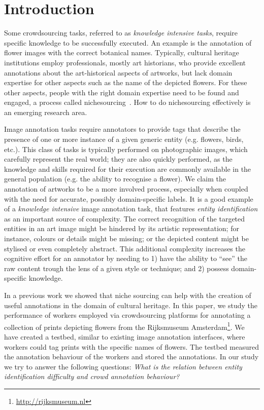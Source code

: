 \documentclass{sig-alternate-2013}
\begin{document}

\section{Introduction}
Some crowdsourcing tasks, referred to as \emph{knowledge intensive tasks}\cite{Oosterman:2014}, require specific knowledge to be successfully executed. An example is the annotation of flower images with the correct botanical names. Typically, cultural heritage institutions employ professionals, mostly art historians, who provide excellent annotations about the art-historical aspects of artworks, but lack domain expertise for other aspects such as the name of the depicted flowers. For these other aspects, people with the right domain expertise need to be found and engaged, a process called nichesourcing~\cite{Boer2012}. How to do nichesourcing effectively is an emerging research area. 

Image annotation tasks require annotators to provide tags that describe the presence of one or more instance of a given generic entity (e.g. flowers, birds, etc.). This class of tasks is typically performed on photographic images, which carefully represent the real world; they are also quickly performed, as the knowledge and skills required for their execution are commonly available in the general population (e.g. the ability to recognise a flower). We claim the annotation of artworks to be a more involved process, especially when coupled with the need for accurate, possibly domain-specific labels. It is a good example of  a \textit{knowledge intensive} image annotation task, that features \textit{entity identification} as an important source of complexity. The correct recognition of the targeted entities in an art image might be hindered by its artistic representation; for instance, colours or details might be missing; or the depicted content might be stylised or even completely abstract. This additional complexity increases the cognitive effort for an annotator by needing to 1) have the ability to ``see'' the raw content trough the lens of a given style or technique; and 2) possess domain-specific knowledge. 

In a previous work\cite{Oosterman:2014} we showed that niche sourcing can help with the creation of useful annotations in the domain of cultural heritage. In this paper, we study the performance of workers employed via crowdsourcing platforms for annotating a collection of prints depicting flowers from the Rijksmuseum Amsterdam\footnote{\url{http://rijksmuseum.nl}}. We have created a testbed, similar to existing image annotation interfaces, where workers could tag prints with the specific names of flowers. The testbed measured the annotation behaviour of the workers and stored the annotations. In our study we try to answer the following questions: \emph{What is the relation between entity identification difficulty and crowd annotation behaviour?}
\end{document}
